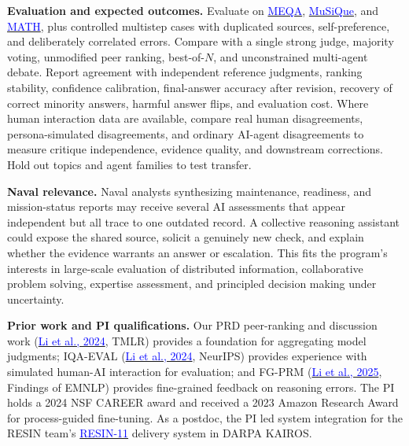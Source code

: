 \documentclass[10pt,letterpaper]{article}
\newcommand{\head}[1]{\textbf{#1}\enspace}
\begin{document}
\head{Evaluation and expected outcomes.} Evaluate on \href{https://proceedings.neurips.cc/paper_files/paper/2024/hash/e560a0b22e4432003d0dba63ff8dc457-Abstract-Datasets_and_Benchmarks_Track.html}{\textcolor{blue}{MEQA}}, \href{https://aclanthology.org/2022.tacl-1.31/}{\textcolor{blue}{MuSiQue}}, and \href{https://arxiv.org/abs/2103.03874}{\textcolor{blue}{MATH}}, plus controlled multistep cases with duplicated sources, self-preference, and deliberately correlated errors. Compare with a single strong judge, majority voting, unmodified peer ranking, best-of-$N$, and unconstrained multi-agent debate. Report agreement with independent reference judgments, ranking stability, confidence calibration, final-answer accuracy after revision, recovery of correct minority answers, harmful answer flips, and evaluation cost. Where human interaction data are available, compare real human disagreements, persona-simulated disagreements, and ordinary AI-agent disagreements to measure critique independence, evidence quality, and downstream corrections. Hold out topics and agent families to test transfer.
\par\head{Naval relevance.} Naval analysts synthesizing maintenance, readiness, and mission-status reports may receive several AI assessments that appear independent but all trace to one outdated record. A collective reasoning assistant could expose the shared source, solicit a genuinely new check, and explain whether the evidence warrants an answer or escalation. This fits the program's interests in large-scale evaluation of distributed information, collaborative problem solving, expertise assessment, and principled decision making under uncertainty.
\par\head{Prior work and PI qualifications.} Our PRD peer-ranking and discussion work (\href{https://arxiv.org/abs/2307.02762}{\textcolor{blue}{Li et al., 2024}}, TMLR) provides a foundation for aggregating model judgments; IQA-EVAL (\href{https://proceedings.neurips.cc/paper_files/paper/2024/file/c6a23b26eaaefd187973658f5001f4fe-Paper-Conference.pdf}{\textcolor{blue}{Li et al., 2024}}, NeurIPS) provides experience with simulated human-AI interaction for evaluation; and FG-PRM (\href{https://doi.org/10.18653/v1/2025.findings-emnlp.228}{\textcolor{blue}{Li et al., 2025}}, Findings of EMNLP) provides fine-grained feedback on reasoning errors. The PI holds a 2024 NSF CAREER award and received a 2023 Amazon Research Award for process-guided fine-tuning. As a postdoc, the PI led system integration for the RESIN team's \href{https://doi.org/10.18653/v1/2022.naacl-demo.7}{\textcolor{blue}{RESIN-11}} delivery system in DARPA KAIROS.
\end{document}
